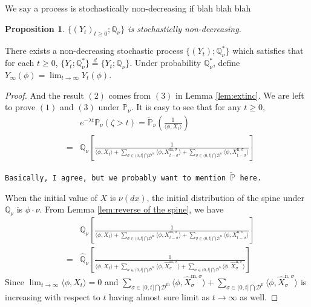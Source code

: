 \documentclass[12pt,a4paper]{amsart}
\numberwithin{equation}{section}
\theoremstyle{plain}
\newtheorem{prop}[thm]{Proposition}
\theoremstyle{definition}
\theoremstyle{remark}
\begin{document}
{\color{blue} We say a process is stochastically non-decreasing if blah blah blah }

\begin{prop}
	$\{(Y_t)_{t\geq 0}; \mathbb Q_\nu \}$ is stochasticlly non-decreasing.
\end{prop}

	There exists a non-decreasing stochastic process $\{(Y_t); \mathbb Q^*_\nu\}$ which satisfies that for each $t\geq 0$, $\{Y_t; \mathbb Q^*_\nu\} \overset{d} = \{Y_t; \mathbb Q_\nu\}$. 
	Under probability $\mathbb Q^*_\nu$, define $Y_\infty(\phi) = \lim_{t\to \infty} Y_t(\phi)$.

\begin{proof}
	And the result $(2)$ comes from $(3)$ in Lemma \ref{lem:extinc}.  We are left to prove $(1)$ and $(3)$ under $\mathbb P_{\nu}$.  It is easy to see that for any $t\ge 0,$
	\begin{eqnarray*}\label{subcritical equality}
		&&e^{-\lambda t}\mathbb P_\nu(\zeta>t)=\widetilde{\mathbb P}_\nu\left(\frac{1}{\langle\phi, X_{t}\rangle }\right)\\
		&=&\mathbb Q_{\nu}\left[\frac{1}{\langle\phi, X_{t}\rangle +\sum_{\sigma\in(0, t]\bigcap\mathcal D^{\mathrm m}}\langle \phi, X_{t-\sigma}^{{\mathrm m},\sigma}\rangle +\sum_{\sigma\in (0, t]\bigcap \mathcal D^{\mathrm n}}\langle \phi, X_{t-\sigma}^{{\mathrm n}, \sigma}\rangle} \right]
	\end{eqnarray*}
	
	{\tt Basically, I agree, but we probably want to mention $\widetilde {\mathbb P}$ here.}
	
	When the initial value of $X$ is $\nu(dx)$, the initial distribution of the spine under $\mathbb Q_\nu$ is $\phi\cdot\nu$.
	From Lemma \ref{lem:reverse of the spine}, we have
	\begin{eqnarray*}\label{duality}
		&&  \mathbb Q_{\nu}\left[\frac{1}{\langle\phi, X_{t}\rangle +\sum_{\sigma\in(0, t]\bigcap\mathcal D^{\mathrm m}}\langle \phi, X_{t-\sigma}^{{\mathrm m},\sigma}\rangle +\sum_{\sigma\in (0, t]\bigcap \mathcal D^{\mathrm n}}\langle \phi, X_{t-\sigma}^{{\mathrm n}, \sigma}\rangle }\right]\\
		&=&\widehat{\mathbb Q}_{\nu}\left[\frac{1}{\langle\phi, X_{t}\rangle +\sum_{\sigma\in(0, t]\bigcap\mathcal D^{\mathrm m}}\langle \phi, \widehat X_{\sigma}^{{\mathrm m},\sigma}\rangle +\sum_{\sigma\in (0, t]\bigcap \mathcal D^{\mathrm n}}\langle \phi, \widehat X_{\sigma}^{{\mathrm n},\sigma}\rangle }\right]
	\end{eqnarray*}
	Since $\lim_{t\to\infty}\langle\phi, X_{t}\rangle=0$ and $\sum_{\sigma\in(0, t]\bigcap\mathcal D^{\mathrm m}}\langle \phi, \widehat X_{\sigma}^{{\mathrm m},\sigma}\rangle +\sum_{\sigma\in (0, t]\bigcap \mathcal D^{\mathrm n}}\langle \phi, \widehat X_{\sigma}^{{\mathrm n},\sigma}\rangle $ is increasing with respect to $t$ having almost sure limit as $t\to\infty$ as well.  
	

\end{proof}
\end{document}
